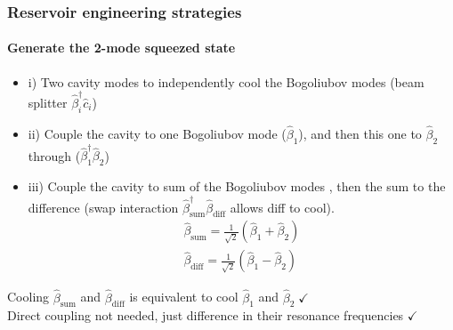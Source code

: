 \documentclass[aspectratio=43]{beamer}
\begin{document}
\begin{frame}
	
	\frametitle{Reservoir engineering strategies}
	\framesubtitle{Generate the 2-mode squeezed state}
	
	\begin{itemize}
		\item i) Two cavity modes to independently cool the Bogoliubov modes (beam splitter $\hat{\beta}^{\dagger}_{i} \hat{c}_{i}$)
		\item ii) Couple the cavity to one Bogoliubov mode ($\hat{\beta}_{1}$), and then this one to $\hat{\beta}_{2}$ through ($\hat{\beta}^{\dagger}_{1} \hat{\beta}_{2}$)
		\item iii) Couple the cavity to sum of the Bogoliubov modes , then the sum to the difference (swap interaction $\hat{\beta}^{\dagger}_{\textrm{sum}} \hat{\beta}_{\textrm{diff}}$ allows diff to cool).
		\begin{align}
			\hat{\beta}_{\textrm{sum}} = \frac{1}{\sqrt{2}}(\hat{\beta}_{1} + \hat{\beta}_{2}) \nonumber \\
			\hat{\beta}_{\textrm{diff}} = \frac{1}{\sqrt{2}}(\hat{\beta}_{1} - \hat{\beta}_{2}) \nonumber
		\end{align}
	\end{itemize}

	Cooling $\hat{\beta}_{\textrm{sum}}$ and $\hat{\beta}_{\textrm{diff}}$ is equivalent to cool $\hat{\beta}_{1}$ and $\hat{\beta}_{2} \; \checkmark$\\
	Direct coupling not needed, just difference in their resonance frequencies $\checkmark$

\end{frame}
\end{document}
